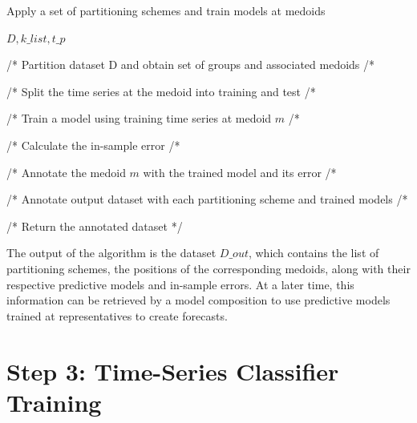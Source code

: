 \begin{algorithm}[h!]
\caption{Apply a set of partitioning schemes and train models at medoids}\label{alg:trainModelsAtMedoids}
\begin{algorithmic}[1] 
 {$D,k\_list,t\_p$}

 

 /* Partition dataset D and obtain set of groups and associated medoids /*
 
 
 /* Split the time series at the medoid into training and test /*
 
 /* Train a model using training time series at medoid $m$ /*
 
 /* Calculate the in-sample error /*
 
 /* Annotate the medoid $m$ with the trained model and its error /*
 \EndFor
 
 /* Annotate output dataset with each partitioning scheme and trained models /*
 
\EndFor

/* Return the annotated dataset */
\EndFunction 
\end{algorithmic} 
\end{algorithm} 

The output of the algorithm is the dataset $D\_out$, which contains the list of partitioning schemes, the positions of the corresponding medoids, along with their respective predictive models and in-sample errors. At a later time, this information can be retrieved by a model composition to use predictive models trained at representatives to create forecasts.

\section{Step 3: Time-Series Classifier Training}
\label{Sec:KnowledgExtraction}

